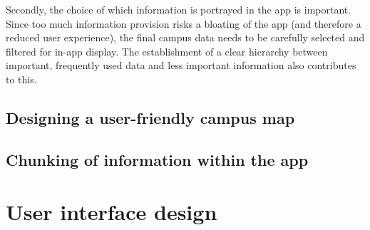 Secondly, the choice of which information is portrayed in the app is important. Since too much information provision risks a bloating of the app (and therefore a reduced user experience), the final campus data needs to be carefully selected and filtered for in-app display. The establishment of a clear hierarchy between important, frequently used data and less important information also contributes to this.

\subsection{Designing a user-friendly campus map}

\subsection{Chunking of information within the app}

\section{User interface design}